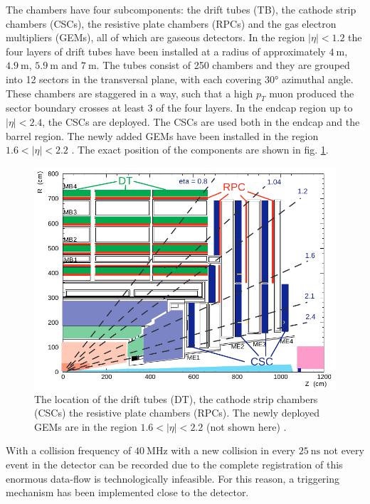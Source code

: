 The chambers have four subcomponents: the drift tubes (TB), the cathode strip chambers (CSCs), the resistive plate chambers (RPCs) and the gas electron multipliers (GEMs), all of which are gaseous detectors. In the region $|\eta|<1.2$ the four layers of drift tubes have been installed at a radius of approximately $\SI{4}{\meter}$, $\SI{4.9}{\meter}$, $\SI{5.9}{\meter}$ and $\SI{7}{\meter}$. The tubes consist of 250 chambers and they are grouped into 12 sectors in the transversal plane, with each covering 30° azimuthal angle. These chambers are staggered in a way, such that a high $p_T$ muon produced the sector boundary crosses at least 3 of the four layers. In the endcap region up to $|\eta| < 2.4$, the CSCs are deployed. The CSCs are used both in the endcap and the barrel region. The newly added GEMs have been installed in the region $1.6 < |\eta| < 2.2$ \cite{Colaleo:2021453}. The exact position of the components are shown in fig. \ref{fig:muonchambers}.

\begin{figure}[h!]
	\centering
	\includegraphics[width=0.8\linewidth]{figures/experiment/muonchambers.pdf}
	\caption{The location of the drift tubes (DT), the cathode strip chambers (CSCs) the resistive plate chambers (RPCs). The newly deployed GEMs are in the region $1.6 < |\eta| < 2.2$ (not shown here) \cite{Bayatian:922757}.}
	\label{fig:muonchambers}
\end{figure}


With a collision frequency of $\SI{40}{\mega\hertz}$ with a new collision in every $\SI{25}{\nano\second}$ not every event in the detector can be recorded due to the complete registration of this enormous data-flow is technologically infeasible. For this reason, a triggering mechanism has been implemented close to the detector.

